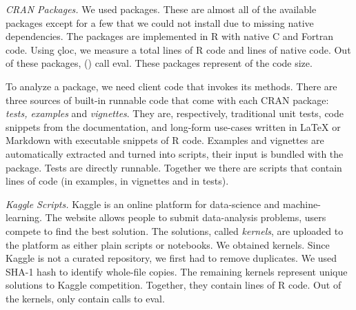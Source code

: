 \documentclass[USenglish,cleveref, autoref, thm-restate]{lipics-v2019}
\newcommand{\mypara}[1]{\medskip\noindent\emph{#1}\xspace}
\begin{document}


\mypara{CRAN Packages.} We used \CranAllPackages packages. These are almost all
of the available packages except for a few that we could not install due to
missing native dependencies. The packages are implemented in R with native C and
Fortran code. Using \c{cloc}, we measure a total \CranAllRCodeRnd lines of R
code and \CranAllNativeCodeRnd lines of native code. Out of these packages,
\CranPackages (\CranPackagesRatio) call eval. These packages represent
\CranCodeRatio of the code size.

To analyze a package, we need client code that invokes its methods. There are
three sources of built-in runnable code that come with each CRAN package:
\emph{tests, examples} and \emph{vignettes}. They are, respectively, traditional
unit tests, code snippets from the documentation, and long-form use-cases
written in \LaTeX\xspace or Markdown with executable snippets of R code.
Examples and vignettes are automatically extracted and turned into scripts,
their input is bundled with the package. Tests are directly runnable. Together
we there are \CranRunnableScripts scripts that contain \CranRunnableCode lines
of code (\CranRunnableCodeExamplesRnd in examples, \CranRunnableCodeVignettesRnd
in vignettes and \CranRunnableCodeTestsRnd in tests).

\mypara{Kaggle Scripts.} Kaggle is an online platform for data-science and
machine-learning. The website allows people to submit data-analysis problems,
users compete to find the best solution. The solutions, called \emph{kernels},
are uploaded to the platform as either plain scripts or notebooks. We obtained
\KaggleKernels kernels. Since Kaggle is not a curated repository, we first had
to remove duplicates. We used SHA-1 hash to identify \KaggleDuplicates
whole-file copies. The remaining \KaggleUnique kernels represent unique
solutions to \KaggleCompetitions Kaggle competition. Together, they contain
\KaggleCode lines of R code. Out of the \KaggleUniqueRnd kernels, only
\KaggleWithEvals contain calls to eval.
\end{document}
